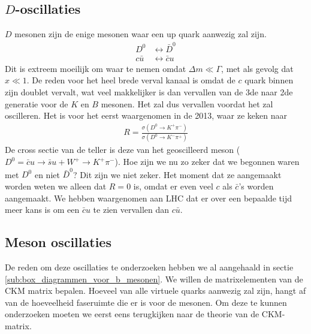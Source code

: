 \documentclass[../main.tex]{subfiles}
\begin{document}
\subsection{$D$-oscillaties}%
\label{sub:_d_oscillaties}

$D$ mesonen zijn de enige mesonen waar een up quark aanwezig zal zijn.
\begin{equation}
    \begin{aligned}
        \label{eq:d_mes_osc}
        D^{0} &\leftrightarrow \bar{D}^{0}\\
        c \bar{u} &\leftrightarrow \bar{c} u
    \end{aligned}
\end{equation}
Dit is extreem moeilijk om waar te nemen omdat $\Delta m \ll \Gamma$, met als gevolg dat $x\ll 1$. De reden voor het heel brede verval kanaal is omdat de $c$ quark binnen zijn doublet vervalt, wat veel makkelijker is dan vervallen van de 3de naar 2de generatie voor de $K$ en $B$ mesonen. Het zal dus vervallen voordat het zal oscilleren. Het is voor het eerst waargenomen in de 2013, waar ze keken naar
\begin{equation}
    \begin{aligned}
        \label{eq:ratio_d_osc}
        R=\frac{\sigma\left(D^{0} \rightarrow K^{+} \pi^{-}\right)}{\sigma\left(D^{0} \rightarrow K^{-} \pi^{+}\right)}
    \end{aligned}
\end{equation}
De cross sectie van de teller is deze van het geoscilleerd meson ($D^0 = \bar{c}u \rightarrow \bar{s}u+W^+ \rightarrow K^+\pi^-$). Hoe zijn we nu zo zeker dat we begonnen waren met $D^0$ en niet $\bar{D}^0$? Dit zijn we niet zeker. Het moment dat ze aangemaakt worden weten we alleen dat $R=0$ is, omdat er even veel $c$ als $\bar{c}$'s worden aangemaakt. We hebben waargenomen aan LHC dat er over een bepaalde tijd meer kans is om een $\bar{c}u$ te zien vervallen dan $c\bar{u}$.

\subsection{Meson oscillaties}%
\label{sub:meson_oscillaties}

De reden om deze oscillaties te onderzoeken hebben we al aangehaald in sectie \ref{sub:box_diagrammen_voor_b_mesonen}. We willen de matrixelementen van de CKM matrix bepalen. Hoeveel van alle virtuele quarks aanwezig zal zijn, hangt af van de hoeveelheid faseruimte die er is voor de mesonen. Om deze te kunnen onderzoeken moeten we eerst eens terugkijken naar de theorie van de CKM-matrix.
\end{document}
